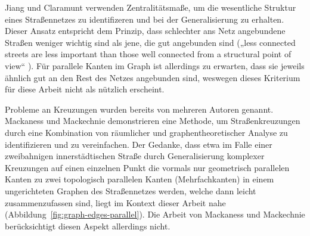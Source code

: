 \documentclass[../main/thesis.tex]{subfiles}
\begin{document}
Jiang und Claramunt verwenden Zentralitätsmaße, um die wesentliche Struktur eines Straßennetzes zu identifizeren und bei der Generalisierung zu erhalten.
Dieser Ansatz entspricht dem Prinzip, dass schlechter ans Netz angebundene Straßen weniger wichtig sind als jene, die gut angebunden sind („less connected streets are less important than those well connected from a structural point of view“ ). 
Für parallele Kanten im Graph ist allerdings zu erwarten, dass sie jeweils ähnlich gut an den Rest des Netzes angebunden sind, weswegen dieses Kriterium für diese Arbeit nicht als nützlich erscheint.


Probleme an Kreuzungen wurden bereits von mehreren Autoren genannt.
Mackaness und Mackechnie demonstrieren eine Methode, um Straßenkreuzungen durch eine Kombination von räumlicher und graphentheoretischer Analyse zu identifizieren und zu vereinfachen. 
Der Gedanke, dass etwa im Falle einer zweibahnigen innerstädtischen Straße durch Generalisierung komplexer Kreuzungen auf einen einzelnen Punkt die vormals nur geometrisch parallelen Kanten zu zwei topologisch parallelen Kanten (Mehrfachkanten) in einem ungerichteten Graphen des Straßennetzes werden, welche dann leicht zusammenzufassen sind, liegt im Kontext dieser Arbeit nahe (Abbildung~\ref{fig:graph-edges-parallel}).
Die Arbeit von Mackaness und Mackechnie berücksichtigt diesen Aspekt allerdings nicht.




\end{document}
